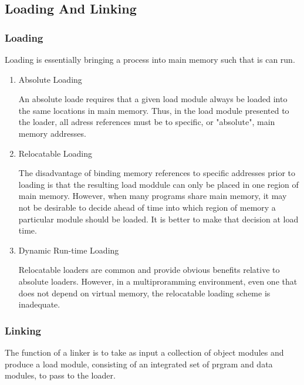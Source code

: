 \documentclass[11pt]{article}
\begin{document}
\subsection{Loading And Linking}
\label{sec:orgheadline28}

\subsubsection{Loading}
\label{sec:orgheadline24}

Loading is essentially bringing a process into main memory such
that is can run.

\begin{enumerate}
\item Absolute Loading
\label{sec:orgheadline21}

An absolute loade requires that a given load module always be 
loaded into the same locations in main memory. Thus, in the load 
module presented to the loader, all adress references must be to specific, or "absolute", main memory addresses.

\item Relocatable Loading
\label{sec:orgheadline22}

The disadvantage of binding memory references to specific 
addresses prior to loading is that the resulting load moddule 
can only be placed in one region of main memory. However, when
many programs share main memory, it may not be desirable to 
decide ahead of time into which region of memory a particular
module should be loaded. It is better to make that decision 
at load time.

\item Dynamic Run-time Loading
\label{sec:orgheadline23}

Relocatable loaders are common and provide obvious benefits relative 
to absolute loaders. However, in a multiproramming environment, 
even one that does not depend on virtual memory, the relocatable
loading scheme is inadequate.
\end{enumerate}

\subsubsection{Linking}
\label{sec:orgheadline27}

The function of a linker is to take as input a collection of 
object modules and produce a load module, consisting of an 
integrated set of prgram and data modules, to pass to the loader. 
\end{document}
